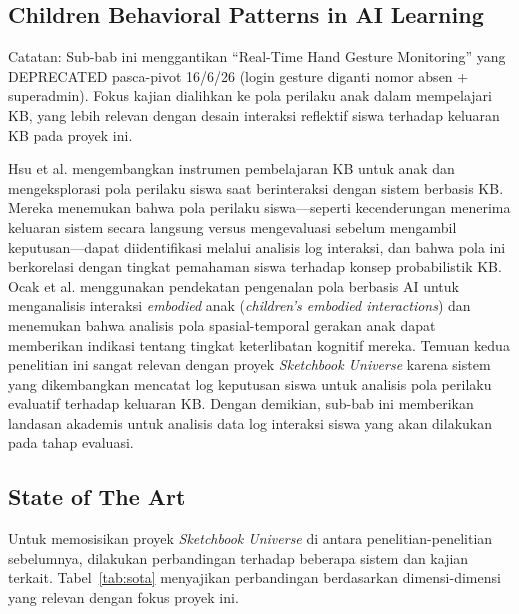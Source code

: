 \documentclass[12pt,a4paper,oneside,openany]{report}
\begin{document}
\subsection{Children Behavioral Patterns in AI Learning}
\label{subsec:penelitian-behavioral-patterns}

Catatan: Sub-bab ini menggantikan ``Real-Time Hand Gesture Monitoring'' yang DEPRECATED pasca-pivot 16/6/26 (login gesture diganti nomor absen + superadmin). Fokus kajian dialihkan ke pola perilaku anak dalam mempelajari KB, yang lebih relevan dengan desain interaksi reflektif siswa terhadap keluaran KB pada proyek ini.

Hsu et al. \cite{ref15} mengembangkan instrumen pembelajaran KB untuk anak dan mengeksplorasi pola perilaku siswa saat berinteraksi dengan sistem berbasis KB. Mereka menemukan bahwa pola perilaku siswa---seperti kecenderungan menerima keluaran sistem secara langsung versus mengevaluasi sebelum mengambil keputusan---dapat diidentifikasi melalui analisis log interaksi, dan bahwa pola ini berkorelasi dengan tingkat pemahaman siswa terhadap konsep probabilistik KB. Ocak et al. \cite{ref16} menggunakan pendekatan pengenalan pola berbasis AI untuk menganalisis interaksi \textit{embodied} anak (\textit{children's embodied interactions}) dan menemukan bahwa analisis pola spasial-temporal gerakan anak dapat memberikan indikasi tentang tingkat keterlibatan kognitif mereka. Temuan kedua penelitian ini sangat relevan dengan proyek \textit{Sketchbook Universe} karena sistem yang dikembangkan mencatat log keputusan siswa untuk analisis pola perilaku evaluatif terhadap keluaran KB. Dengan demikian, sub-bab ini memberikan landasan akademis untuk analisis data log interaksi siswa yang akan dilakukan pada tahap evaluasi.

\subsection{State of The Art}
\label{subsec:state-of-the-art}

Untuk memosisikan proyek \textit{Sketchbook Universe} di antara penelitian-penelitian sebelumnya, dilakukan perbandingan terhadap beberapa sistem dan kajian terkait. Tabel~\ref{tab:sota} menyajikan perbandingan berdasarkan dimensi-dimensi yang relevan dengan fokus proyek ini.
\end{document}
